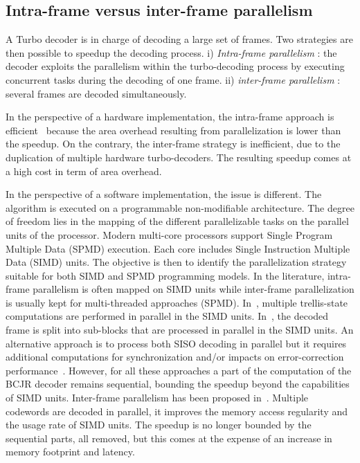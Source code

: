 \subsection{Intra-frame versus inter-frame parallelism}

A Turbo decoder is in charge of decoding a large set of frames. Two strategies{}
are then possible to speedup the decoding process. i)
\textit{Intra-frame parallelism} : the decoder exploits the parallelism within
the turbo-decoding process by executing concurrent tasks during
the decoding of one frame. ii) \textit{inter-frame parallelism} : several frames
are decoded simultaneously.

In the perspective of a hardware implementation, the intra-frame approach is
efficient~\cite{Muller2009} because the area overhead resulting from
parallelization is lower than the speedup. On the contrary, the inter-frame
strategy is inefficient, due to the duplication of multiple hardware
turbo-decoders. The resulting speedup comes at a high cost in term of area
overhead.

In the perspective of a software implementation, the issue is different. The
algorithm is executed on a programmable non-modifiable architecture. The degree
of freedom lies in the mapping of the different parallelizable tasks on the
parallel units of the processor. Modern multi-core processors support Single
Program Multiple Data (SPMD) execution. Each core includes Single Instruction
Multiple Data (SIMD) units. The objective is then to identify the
parallelization strategy suitable for both SIMD and SPMD programming models.
In the literature, intra-frame parallelism is often mapped on SIMD units while
inter-frame parallelization is usually kept for multi-threaded approaches
(SPMD). In~\cite{Zhang2012,Wu2013}, multiple trellis-state computations are
performed in parallel in the SIMD units. In~\cite{Wu2010,Wu2011,Chinnici2012,
Yoge2012,Zhang2012,Liu2013,Chen2013,Xianjun2013,Wu2013,Zhang2014,Li2014}, the
decoded frame is split into sub-blocks that are processed in parallel in the
SIMD units. An alternative approach is to process both SISO decoding in parallel
but it requires additional computations for synchronization and/or impacts on
error-correction performance~\cite{Muller2009}. However, for all these
approaches a part of the computation of the BCJR decoder remains sequential,
bounding the speedup beyond the capabilities of SIMD units. Inter-frame
parallelism has been proposed in~\cite{Wu2010,Wu2011,Zhang2012,Wu2013}. Multiple
codewords are decoded in parallel, it improves the memory access regularity and
the usage rate of SIMD units. The speedup is no longer bounded by the sequential
parts, all removed, but this comes at the expense of an increase in memory
footprint and latency.

